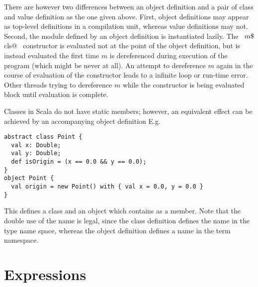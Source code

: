 \documentclass[a4paper,12pt,twoside,titlepage]{book}
\begin{document}
There are however two differences between an object definition and a
pair of class and value definition as the one given above.  First,
object definitions may appear as top-level definitions in a
compilation unit, whereas value definitions may not.  Second, the
module defined by an object definition is instantiated lazily.  The
~\lstinline@new $m\mbox{\$}$cls@~ constructor is evaluated not at the point
of the object definition, but is instead evaluated the first time $m$
is dereferenced during execution of the program (which might be never
at all). An attempt to dereference $m$ again in the course of
evaluation of the constructor leads to a infinite loop or run-time
error.  Other threads trying to dereference $m$ while the constructor
is being evaluated block until evaluation is complete.

\example
Classes in Scala do not have static members; however, an equivalent
effect can be achieved by an accompanying object definition
E.g.
\begin{lstlisting}
abstract class Point {
  val x: Double;
  val y: Double;
  def isOrigin = (x == 0.0 && y == 0.0);
}
object Point {
  val origin = new Point() with { val x = 0.0, y = 0.0 }
}
\end{lstlisting}
This defines a class  and an object  which
contains  as a member.  Note that the double use of the
name  is legal, since the class definition defines the name
 in the type name space, whereas the object definition
defines a name in the term namespace.


\chapter{Expressions}
\label{sec:exprs}
\end{document}
